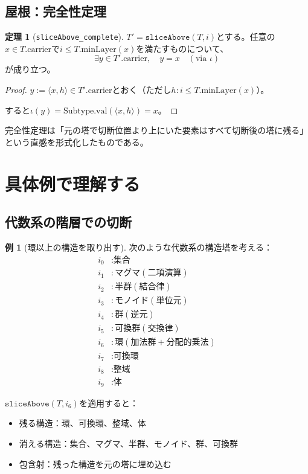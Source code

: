 \documentclass[a4paper,11pt]{article}
\theoremstyle{definition}
\newtheorem{theorem}[definition]{定理}
\newtheorem{example}[definition]{例}
\begin{document}
\subsection{屋根：完全性定理}

\begin{theorem}[\texttt{sliceAbove\_complete}]
$T' = \texttt{sliceAbove}(T, i)$とする。任意の$x \in T.\text{carrier}$で$i \leq T.\text{minLayer}(x)$を満たすものについて、
\[
\exists y \in T'.\text{carrier}, \quad y = x \quad (\text{via } \iota)
\]
が成り立つ。
\end{theorem}

\begin{proof}
$y := \langle x, h \rangle \in T'.\text{carrier}$とおく（ただし$h : i \leq T.\text{minLayer}(x)$）。

すると$\iota(y) = \text{Subtype.val}(\langle x, h \rangle) = x$。
\end{proof}

\begin{keyidea}
完全性定理は「元の塔で切断位置より上にいた要素はすべて切断後の塔に残る」という直感を形式化したものである。
\end{keyidea}

\section{具体例で理解する}

\subsection{代数系の階層での切断}

\begin{example}[環以上の構造を取り出す]
次のような代数系の構造塔を考える：
\begin{align*}
i_0 &: \text{集合} \\
i_1 &: \text{マグマ}(二項演算) \\
i_2 &: \text{半群}(結合律) \\
i_3 &: \text{モノイド}(単位元) \\
i_4 &: \text{群}(逆元) \\
i_5 &: \text{可換群}(交換律) \\
i_6 &: \text{環}(加法群+分配的乗法) \\
i_7 &: \text{可換環} \\
i_8 &: \text{整域} \\
i_9 &: \text{体}
\end{align*}

$\texttt{sliceAbove}(T, i_6)$を適用すると：
\begin{itemize}
    \item 残る構造：環、可換環、整域、体
    \item 消える構造：集合、マグマ、半群、モノイド、群、可換群
    \item 包含射：残った構造を元の塔に埋め込む
\end{itemize}
\end{example}
\end{document}
